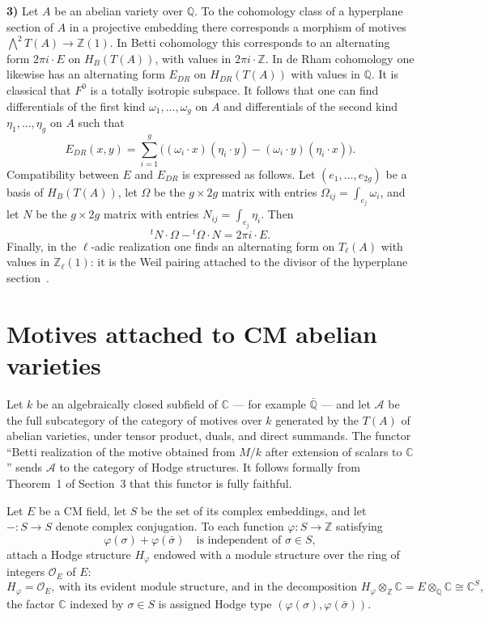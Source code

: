\documentclass[11pt]{amsart}
\theoremstyle{definition}
\newcommand{\ZZ}{\mathbb{Z}}
\newcommand{\QQ}{\mathbb{Q}}
\newcommand{\CC}{\mathbb{C}}
\begin{document}
\noindent\textbf{3)} Let $A$ be an abelian variety over $\QQ$. To the cohomology class of a hyperplane section of $A$ in a projective embedding there corresponds a morphism of motives $\bigwedge^2 T(A)\to \ZZ(1)$. In Betti cohomology this corresponds to an alternating form $2\pi i\cdot E$ on $H_B(T(A))$, with values in $2\pi i\cdot\ZZ$. In de Rham cohomology one likewise has an alternating form $E_{DR}$ on $H_{DR}(T(A))$ with values in $\QQ$. It is classical that $F^0$ is a totally isotropic subspace. It follows that one can find differentials of the first kind $\omega_1,\dots,\omega_g$ on $A$ and differentials of the second kind $\eta_1,\dots,\eta_g$ on $A$ such that
\[
E_{DR}(x,y)=\sum_{i=1}^g \bigl((\omega_i\cdot x)(\eta_i\cdot y) - (\omega_i\cdot y)(\eta_i\cdot x)\bigr).
\]
Compatibility between $E$ and $E_{DR}$ is expressed as follows. Let $(e_1,\dots,e_{2g})$ be a basis of $H_B(T(A))$, let $\Omega$ be the $g\times 2g$ matrix with entries $\Omega_{ij}=\int_{e_j}\omega_i$, and let $N$ be the $g\times 2g$ matrix with entries $N_{ij}=\int_{e_j}\eta_i$. Then
\[
{}^t\!N\cdot\Omega - {}^t\!\Omega\cdot N = 2\pi i\cdot E.
\]
Finally, in the $\ell$-adic realization one finds an alternating form on $T_\ell(A)$ with values in $\ZZ_\ell(1)$: it is the Weil pairing attached to the divisor of the hyperplane section~\cite{Weil1}.

\section{Motives attached to CM abelian varieties}

Let $k$ be an algebraically closed subfield of $\CC$ --- for example $\bar{\QQ}$ --- and let $\mathcal A$ be the full subcategory of the category of motives over $k$ generated by the $T(A)$ of abelian varieties, under tensor product, duals, and direct summands. The functor ``Betti realization of the motive obtained from $M/k$ after extension of scalars to $\CC$'' sends $\mathcal A$ to the category of Hodge structures. It follows formally from Theorem~1 of Section~3 that this functor is fully faithful.

Let $E$ be a CM field, let $S$ be the set of its complex embeddings, and let $-:S\to S$ denote complex conjugation. To each function $\varphi:S\to\ZZ$ satisfying
\begin{equation}\tag{*}
\varphi(\sigma)+\varphi(\bar\sigma)\quad\text{is independent of }\sigma\in S,
\end{equation}
attach a Hodge structure $H_\varphi$ endowed with a module structure over the ring of integers $\mathcal O_E$ of $E$:
\[
H_\varphi = \mathcal O_E,\ \text{with its evident module structure, and in the decomposition } H_\varphi\otimes_\ZZ\CC = E\otimes_\QQ\CC \cong \CC^S,
\]
the factor $\CC$ indexed by $\sigma\in S$ is assigned Hodge type $(\varphi(\sigma),\varphi(\bar\sigma))$.
\end{document}
